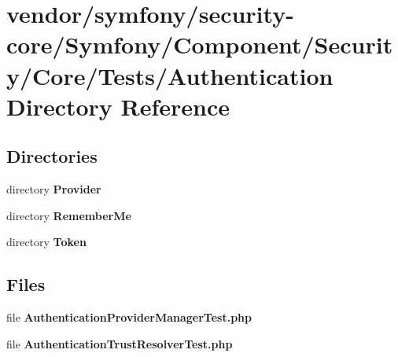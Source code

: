 \section{vendor/symfony/security-\/core/\+Symfony/\+Component/\+Security/\+Core/\+Tests/\+Authentication Directory Reference}
\label{dir_e8fbe6a383867f80d84ca31f9c6612d6}
\subsection*{Directories}
\begin{DoxyCompactItemize}
\item 
directory {\bf Provider}
\item 
directory {\bf Remember\+Me}
\item 
directory {\bf Token}
\end{DoxyCompactItemize}
\subsection*{Files}
\begin{DoxyCompactItemize}
\item 
file {\bf Authentication\+Provider\+Manager\+Test.\+php}
\item 
file {\bf Authentication\+Trust\+Resolver\+Test.\+php}
\end{DoxyCompactItemize}
